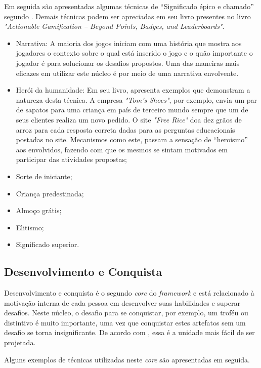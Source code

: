 Em seguida são apresentadas algumas técnicas de ``Significado épico e chamado'' segundo .
Demais técnicas podem ser apreciadas em seu livro presentes no livro \textit{"Actionable Gamification – Beyond Points, Badges, and Leaderboards"}.

\begin{itemize}
	\item Narrativa: A maioria dos jogos iniciam com uma história que mostra aos jogadores o contexto sobre o qual está
	inserido o jogo e o quão importante o jogador é para solucionar os desafios propostos. Uma das maneiras mais eficazes
	em utilizar este núcleo é por meio de uma narrativa envolvente. 
	\item Herói da humanidade: Em seu livro,  apresenta exemplos que demonstram a natureza desta
	técnica. A empresa \textit{"Tom's Shoes"}, por exemplo, envia um par de sapatos para uma criança em país de terceiro mundo sempre
	que um de seus clientes realiza um novo pedido. O site \textit{"Free Rice"} doa dez grãos de arroz para cada resposta correta dadas
	para as perguntas educacionais postadas no site. Mecanismos como este, passam a sensação de ``heroismo'' aos envolvidos, fazendo com que 
	os mesmos se sintam motivados em participar das atividades propostas;
	\item Sorte de iniciante;
	\item Criança predestinada;
	\item Almoço grátis;
	\item Elitismo;
	\item Significado superior.

\end{itemize}

\subsection{Desenvolvimento e Conquista}
Desenvolvimento e conquista é o segundo \textit{core} do \textit{framework} e está relacionado à motivação interna de 
cada pessoa em desenvolver suas habilidades e superar desafios. Neste núcleo, o desafio para se conquistar, por exemplo, 
um troféu ou distintivo é muito importante, uma vez que conquistar estes artefatos sem um desafio se torna insignificante.
De acordo com , essa é a unidade mais fácil de ser projetada. 

Alguns exemplos de técnicas utilizadas neste \textit{core} são apresentadas em seguida.

